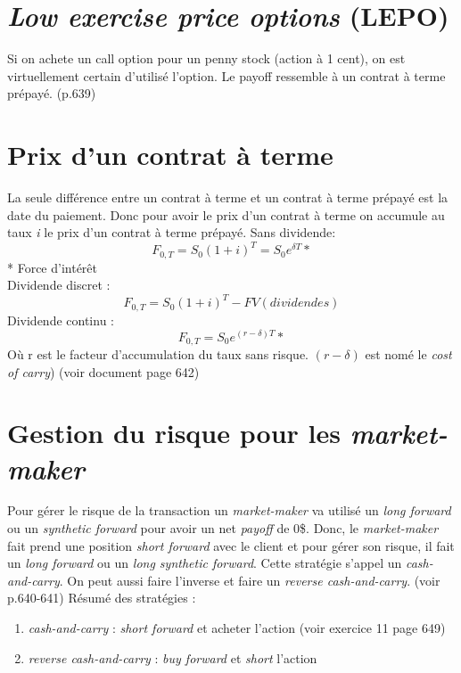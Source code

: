 \documentclass[11pt,french]{report}
\begin{document}
\section{\emph{Low exercise price options} (LEPO)}
\label{sec:low exercise}

Si on achete un call option pour un penny stock (action à 1 cent), on est virtuellement certain d'utilisé l'option. Le payoff ressemble à un contrat à terme prépayé. (p.639)

\section{Prix d'un contrat à terme}
\label{sec:forward contrats price}

La seule différence entre un contrat à terme et un contrat à terme prépayé est la date du paiement. Donc pour avoir le prix d'un contrat à terme on accumule au taux \textit{i} le prix d'un contrat à terme prépayé. 
Sans dividende:
\begin{equation}
F_{0,T} = S_0(1+i)^T = S_0e^{\delta T}* 
\end{equation}
* Force d'intérêt
\\Dividende discret :
\begin{equation}
F_{0,T} = S_0(1+i)^T - FV(dividendes)
\end{equation}
Dividende continu :
\begin{equation}
F_{0,T} = S_0e^{(r - \delta) T}* 
\end{equation}
Où r est le facteur d'accumulation du taux sans risque. $ (r- \delta)$ est nomé le \emph{cost of carry}) (voir document page 642)

\section{Gestion du risque pour les \emph{market-maker}}
\label{sec:risk managements market maker}

Pour gérer le risque de la transaction un \emph{market-maker} va utilisé un \emph{long forward} ou un \emph{synthetic forward} pour avoir un net \emph{payoff} de 0\$. Donc, le \emph{market-maker} fait prend une position \emph{short forward} avec le client et pour gérer son risque, il fait un \emph{long forward} ou un \emph{long synthetic forward}. Cette stratégie s'appel un \emph{cash-and-carry}. On peut aussi faire l'inverse et faire un \emph{reverse cash-and-carry}. (voir p.640-641) Résumé des stratégies :
\begin{enumerate}
\item \emph{cash-and-carry} : \emph{short forward} et acheter l'action (voir exercice 11 page 649)
\item \emph{reverse cash-and-carry} : \emph{buy forward} et \emph{short} l'action
\end{enumerate}
\end{document}
